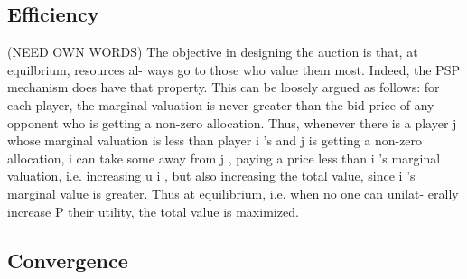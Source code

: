 \documentclass[12pt]{article}
\theoremstyle{definition}
\begin{document}
\begin{multicols}{2}
\subsection{Efficiency}
(NEED OWN WORDS)
The objective in designing the auction is that, at equilbrium, resources al-
ways go to those who value them most. Indeed, the PSP mechanism does
have that property. This can be loosely argued as follows: for each player,
the marginal valuation is never greater than the bid price of any opponent
who is getting a non-zero allocation. Thus, whenever there is a player j
whose marginal valuation is less than player i 's and j is getting a non-zero
allocation, i can take some away from j , paying a price less than i 's marginal
valuation, i.e. increasing u i , but also increasing the total value, since i 's
marginal value is greater. Thus at equilibrium, i.e. when no one can unilat-
erally increase P their utility, the total value is maximized.

\subsection{Convergence}

\end{multicols}
\end{document}
